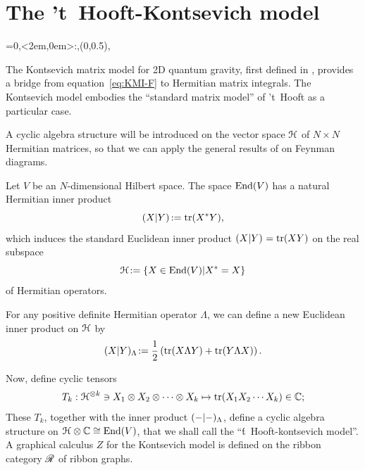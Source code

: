\section{The 't~Hooft-Kontsevich model}
\label{sec:matrix-models}
\everyxy={0,<2em,0em>:,(0,0.5),} %

The Kontsevich matrix model for 2D quantum gravity, first defined in
\cite{kontsevich;intersection-theory;1992}, provides a bridge from
equation~\eqref{eq:KMI-F} to Hermitian matrix integrals. The
Kontsevich model embodies the ``standard matrix model'' of 't~Hooft as
a particular case. 

A cyclic algebra structure will be introduced on the vector space
$\Hermitian[N]$ of $N\times N$ Hermitian matrices, so that we can apply the
general results of  on Feynman diagrams.

Let $V$ be an $N$-dimensional Hilbert space. The space $\End(V)$
has a natural Hermitian inner product
\begin{equation*} 
  \inner{X}{Y}\joinrel:=\tr(X^*Y),
\end{equation*}
which induces the standard Euclidean inner product $\inner{X}{Y} =
\tr(XY)$ on the real subspace
\begin{equation*}
  \Hermitian[N]\joinrel:=\{X\in \End(V) | X^*=X\}
\end{equation*}
of Hermitian operators.  

For any positive definite Hermitian operator $\Lambda$, we can define
a new Euclidean inner product on $\Hermitian[N]$ by
\begin{equation*}
  \inner[\Lambda]{X}{Y} \joinrel:= 
  \onehalf \left(\tr(X\Lambda Y) + \tr(Y\Lambda X)\right).
\end{equation*}

Now, define cyclic tensors
\begin{equation*}
  T_k:\Hermitian[N]\tp{k} \ni X_1 \otimes X_2 \otimes \dots \otimes X_k 
  \mapsto 
  \tr(X_1X_2\cdots X_k) \in \setC;
\end{equation*}
These $T_k$, together with the inner product $\inner[\Lambda]{-}{-}$, define
a cyclic algebra structure on $\Hermitian[N] \otimes \setC \cong \End(V)$, that we
shall call the ``\'t~Hooft-kontsevich model''.  A graphical calculus
$Z$ for the Kontsevich model is defined on the ribbon category $\RG$
of ribbon graphs.

